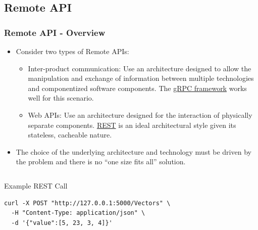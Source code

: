 \documentclass[t]{beamer}
\begin{document}
\subsection{Remote API}
\begin{frame}[fragile=singleslide]
  \frametitle{Remote API - Overview}
  \vspace{-10pt}

  \begin{itemize}
  \item Consider two types of Remote APIs:
    \begin{itemize}
    \item{Inter-product communication: Use an architecture designed to allow
      the manipulation and exchange of information between multiple
      technologies and componentized software
      components. The \href{https://grpc.io/}{gRPC framework} works well for this
      scenario.}
    \item{Web APIs: Use an architecture designed for the interaction of
       physically separate components. \href{https://restfulapi.net/}{REST} is
       an ideal architectural style given its stateless, cacheable nature.}
    \end{itemize}
  \item The choice of the underlying architecture and technology must be driven
    by the problem and there is no ``one size fits all'' solution.
  \end{itemize}

  \pyramidthree{}

  \vspace{-20pt}
  \begin{columns}[T]
    \begin{column}{.6\textwidth}
      \begin{exampleblock}{\small Example REST Call}
        \begin{lstlisting}[basicstyle=\scriptsize]
curl -X POST "http://127.0.0.1:5000/Vectors" \
  -H "Content-Type: application/json" \
  -d '{"value":[5, 23, 3, 4]}'
        \end{lstlisting}
      \end{exampleblock}
    \end{column}
    \begin{column}{.2\textwidth}
    \end{column}
  \end{columns}

\end{frame}
\end{document}
